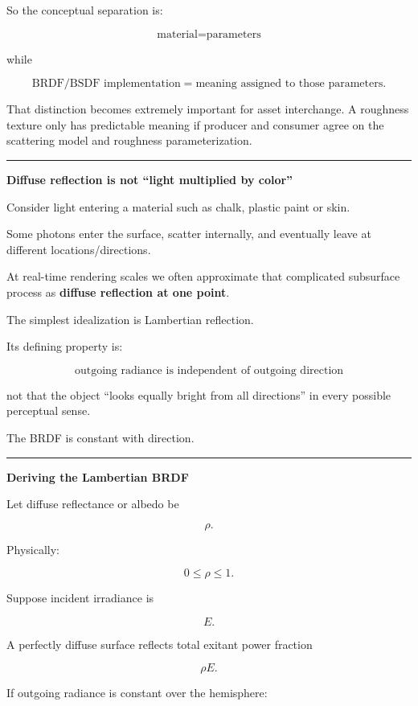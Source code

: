 So the conceptual separation is:

\[
\boxed{
\text{material}
=
\text{parameters}
}
\]

while

\[
\boxed{
\text{BRDF/BSDF implementation}
=
\text{meaning assigned to those parameters}.
}
\]

That distinction becomes extremely important for asset interchange. A roughness texture only has predictable meaning if producer and consumer agree on the scattering model and roughness parameterization.

\begin{center}\rule{0.5\linewidth}{0.5pt}\end{center}

\textbf{Diffuse reflection is not ``light multiplied by color''}

Consider light entering a material such as chalk, plastic paint or skin.

Some photons enter the surface, scatter internally, and eventually leave at different locations/directions.

At real-time rendering scales we often approximate that complicated subsurface process as \textbf{diffuse reflection at one point}.

The simplest idealization is Lambertian reflection.

Its defining property is:

\[
\boxed{
\text{outgoing radiance is independent of outgoing direction}
}
\]

not that the object ``looks equally bright from all directions'' in every possible perceptual sense.

The BRDF is constant with direction.

\begin{center}\rule{0.5\linewidth}{0.5pt}\end{center}

\textbf{Deriving the Lambertian BRDF}

Let diffuse reflectance or albedo be

\[
\rho.
\]

Physically:

\[
0\le\rho\le1.
\]

Suppose incident irradiance is

\[
E.
\]

A perfectly diffuse surface reflects total exitant power fraction

\[
\rho E.
\]

If outgoing radiance is constant over the hemisphere:

